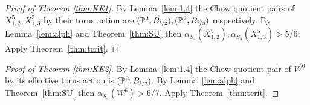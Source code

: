 \begin{proof}[Proof of Theorem \ref{thm:KE1}]
By Lemma~\ref{lem:1.4} the Chow quotient pairs of \(X_{1,2}^{5},X_{1,3}^{5}\) by their torus action are \((\mathbb{P}^2,B_{\nicefrac{1}{2}}), (\mathbb{P}^2,B_{\nicefrac{2}{3}})\) respectively. By Lemma~\ref{lem:alph} and Theorem~\ref{thm:SU} then \(\alpha_{S_4}(X_{1,2}^{5}),\alpha_{S_4}(X_{1,3}^{5}) > 5/6\). Apply Theorem~\ref{thm:tcrit}.
\end{proof}
\begin{proof}[Proof of Theorem \ref{thm:KE2}]
By Lemma~\ref{lem:1.4} the Chow quotient pair of \(W^6\) by its effective torus action is \((\mathbb{P}^2,B_{\nicefrac{1}{2}})\). By Lemma~\ref{lem:alph} and Theorem~\ref{thm:SU} then \(\alpha_{S_4}(W^6) > 6/7\). Apply Theorem~\ref{thm:tcrit}.
\end{proof}